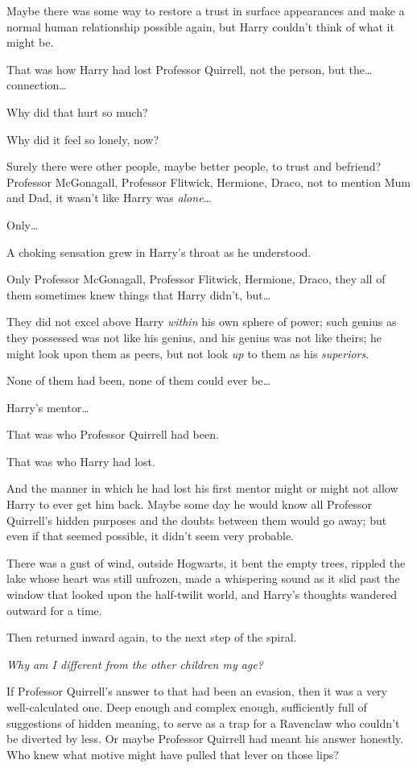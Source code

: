 Maybe there was some way to restore a trust in surface appearances and make a normal human relationship possible again, but Harry couldn't think of what it might be.

That was how Harry had lost Professor Quirrell, not the person, but the{\ldots} connection{\ldots}

Why did that hurt so much?

Why did it feel so lonely, now?

Surely there were other people, maybe better people, to trust and befriend? Professor McGonagall, Professor Flitwick, Hermione, Draco, not to mention Mum and Dad, it wasn't like Harry was \emph{alone{\ldots}}

Only{\ldots}

A choking sensation grew in Harry's throat as he understood.

Only Professor McGonagall, Professor Flitwick, Hermione, Draco, they all of them sometimes knew things that Harry didn't, but{\ldots}

They did not excel above Harry \emph{within} his own sphere of power; such genius as they possessed was not like his genius, and his genius was not like theirs; he might look upon them as peers, but not look \emph{up} to them as his \emph{superiors}.

None of them had been, none of them could ever be{\ldots}

Harry's mentor{\ldots}

That was who Professor Quirrell had been.

That was who Harry had lost.

And the manner in which he had lost his first mentor might or might not allow Harry to ever get him back. Maybe some day he would know all Professor Quirrell's hidden purposes and the doubts between them would go away; but even if that seemed possible, it didn't seem very probable.

There was a gust of wind, outside Hogwarts, it bent the empty trees, rippled the lake whose heart was still unfrozen, made a whispering sound as it slid past the window that looked upon the half-twilit world, and Harry's thoughts wandered outward for a time.

Then returned inward again, to the next step of the spiral.

\emph{Why am I different from the other children my age?}

If Professor Quirrell's answer to that had been an evasion, then it was a very well-calculated one. Deep enough and complex enough, sufficiently full of suggestions of hidden meaning, to serve as a trap for a Ravenclaw who couldn't be diverted by less. Or maybe Professor Quirrell had meant his answer honestly. Who knew what motive might have pulled that lever on those lips?


